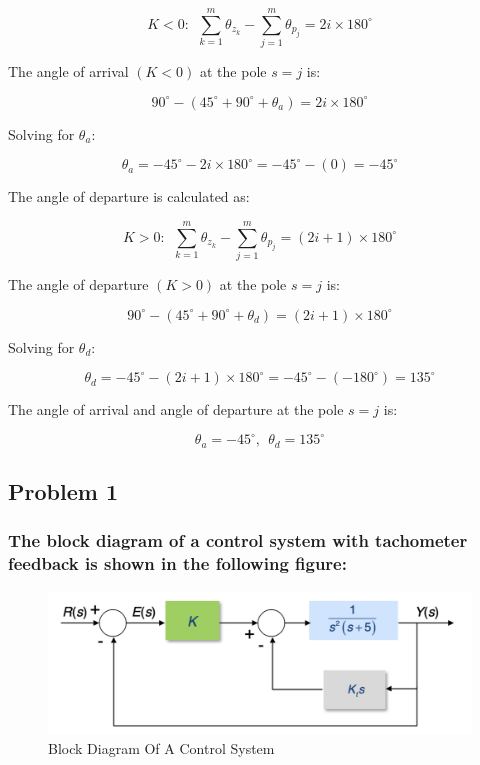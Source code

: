 \documentclass[12pt, letterpaper]{../assignment}
\begin{document}
$$ K < 0:  \ \ \sum^m_{k = 1}\theta_{z_k} - \sum^m_{j = 1}\theta_{p_j} = 2i\times 180^{\circ} $$

The angle of arrival $(K < 0)$ at the pole $s = j$ is:

$$ 90^{\circ} - (45^{\circ} + 90^{\circ} + \theta_a) = 2i \times 180^{\circ} $$

Solving for $\theta_a$:

$$ \theta_a = -45^{\circ} - 2i \times 180^{\circ} = -45^{\circ} - (0)  = -45^{\circ} $$

The angle of departure is calculated as:

$$ K > 0:  \ \ \sum^m_{k = 1}\theta_{z_k} - \sum^m_{j = 1}\theta_{p_j} = (2i+1)\times 180^{\circ} $$

The angle of departure $(K > 0)$ at the pole $s = j$ is:

$$ 90^{\circ} - (45^{\circ} + 90^{\circ} + \theta_d) = (2i+1)\times 180^{\circ} $$

Solving for $\theta_d$:

$$ \theta_d = -45^{\circ} - (2i+1)\times 180^{\circ} = -45^{\circ} - (-180^{\circ})  = 135^{\circ} $$

The angle of arrival and angle of departure at the pole $s = j$ is:

\begin{answer}
$$ \theta_a = -45^{\circ}, \ \ \theta_d = 135^{\circ} $$
\end{answer}

\subsection*{Problem 1}
\subsubsection*{The block diagram of a control system with tachometer feedback is shown in the following figure:}

\begin{figure}[H]
    \centering
    \includegraphics[width=0.7\linewidth]{./figures/Q2_block_diagram.png}
    \caption{Block Diagram Of A Control System}
    \label{fig:bd_ctrl}
\end{figure}
\end{document}
